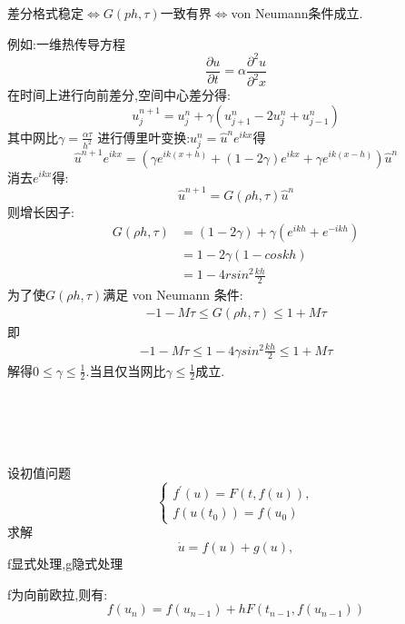 \documentclass{article}
\begin{document}
\begin{CJK}{UTF8}{gkai}
差分格式稳定$\Leftrightarrow G(ph,\tau)$一致有界$\Leftrightarrow$von Neumann条件成立.

例如:一维热传导方程
\begin{equation}
\frac{\partial u}{\partial t}=\alpha\frac{\partial^2 u}{\partial^2 x}
\end{equation}
在时间上进行向前差分,空间中心差分得:
\begin{equation}
u_{j}^{n+1}=u_{j}^{n}+\gamma(u_{j+1}^n-2u_{j}^n+u_{j-1}^n)
\end{equation}
其中网比$\gamma=\frac{\alpha\tau}{h^2}$
进行傅里叶变换:$u_{j}^n=\hat{u}^{n}e^{ikx}$得
\begin{equation}
\hat{u}^{n+1}e^{ikx}=(\gamma e^{ik(x+h)}+(1-2\gamma)e^{ikx}+\gamma e^{ik(x-h)})\hat{u}^{n}
\end{equation}
消去$e^{ikx}$得:
\begin{equation}
\hat{u}^{n+1}=G(\rho h,\tau)\hat{u}^n
\end{equation}
则增长因子:
\begin{align}
G(\rho h,\tau)&=(1-2\gamma)+\gamma (e^{ikh}+e^{-ikh})\\
&=1-2\gamma (1-coskh)\\
&=1-4rsin^{2}\frac{kh}{2}
\end{align}
为了使$G(\rho h,\tau)$满足 von Neumann 条件:
\begin{align}
-1-M\tau\le G(\rho h,\tau)\le 1+M\tau
\end{align}
即
\begin{align}
-1-M\tau\le 1-4\gamma sin^2\frac{kh}{2}\le 1+M\tau
\end{align}
解得$0\le \gamma\le \frac{1}{2}$.当且仅当网比$\gamma\le \frac{1}{2}$成立.

\par 
~\\
~\\
~\\
~\\

设初值问题
\begin{equation*}
\begin{cases}
f^{'}(u)=F(t,f(u)),\\
f(u(t_{0}))=f(u_{0})
\end{cases}
\end{equation*}
求解
\begin{equation}
\dot{u}=f(u)+g(u),
\label{12}
\end{equation}
f显式处理,g隐式处理

f为向前欧拉,则有:
\begin{equation}
f(u_{n})=f(u_{n-1})+hF(t_{n-1},f(u_{n-1}))
\end{equation}


\end{CJK}
\end{document}
